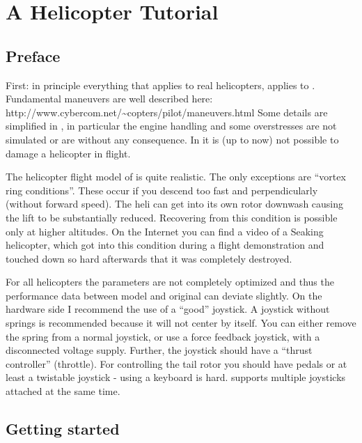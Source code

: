 \chapter{A Helicopter Tutorial}
\label{helicopter}

\section{Preface}
 
First: in principle everything that applies to real helicopters, applies 
to \FlightGear. Fundamental maneuvers are well described here:\\ 
{http://www.cybercom.net/\~{}copters/pilot/maneuvers.html} Some details are 
simplified in \FlightGear, in particular the engine handling and some 
overstresses are not simulated or are without any consequence. 
In \FlightGear{} it is (up to now) not possible to damage a helicopter in 
flight. 


The helicopter flight model of \FlightGear{} is 
quite realistic. The only exceptions are ``vortex ring conditions''. 
These occur if you descend too fast and perpendicularly 
(without forward speed). The heli can get into its own rotor downwash 
causing the lift to be substantially reduced. Recovering from this condition 
is possible only at higher altitudes. On the Internet you can find a video 
of a Seaking helicopter, which got into this condition during a flight 
demonstration and touched down so hard afterwards that it was completely 
destroyed. 

For all \FlightGear{} helicopters the parameters are not completely optimized 
and thus the performance data between model and original can deviate slightly. 
On the hardware side I recommend the use of a ``good'' joystick. A joystick 
without springs is recommended because it will not center by itself. You 
can either remove the spring from a normal joystick, or use a force feedback 
joystick, with a disconnected voltage supply. Further, the joystick should 
have a ``thrust controller'' (throttle). For controlling the tail rotor you 
should have pedals or at least a twistable joystick - using a keyboard is hard.
\FlightGear{} supports multiple joysticks attached at the same time. 

\section{Getting started}

